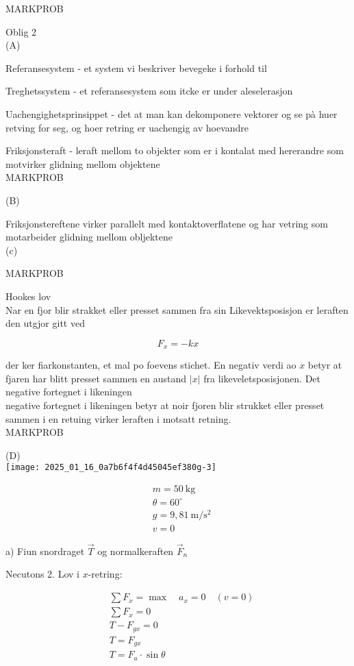 \documentclass[10pt]{article}
\begin{document}
MARKPROB

Oblig 2\\
(A)

Referansesystem - et system vi beskriver bevegeke i forhold til

Treghetssystem - et referansesystem som itcke er under aleselerasjon

Uachengighetsprinsippet - det at man kan dekomponere vektorer og se pà huer retving for seg, og hoer retring er uachengig av hoevandre

Friksjonsteraft - leraft mellom to objekter som er i kontalat med hererandre som motvirker glidning mellom objektene\\

MARKPROB

(B)

Friksjonstereftene virker parallelt med kontaktoverflatene og har vetring som motarbeider glidning mellom obljektene\\
(c)

MARKPROB

Hookes lov\\
Nar en fjor blir strakket eller presset sammen fra sin Likevektsposisjon er leraften den utgjor gitt ved

$$
F_{x}=-k x
$$

der ker fiarkonstanten, et mal po foevens stichet. En negativ verdi ao $x$ betyr at fjaren har blitt presset sammen en austand $|x|$ fra likeveletsposisjonen. Det negative fortegnet i likeningen\\
negative fortegnet i likeningen betyr at noir fjoren blir strukket eller presset sammen i en retuing virker leraften i motsatt retning.\\

MARKPROB

(D)\\
\texttt{[image: 2025\_01\_16\_0a7b6f4f4d45045ef380g-3]}

$$
\begin{aligned}
& m=50 \mathrm{~kg} \\
& \theta=60^{\circ} \\
& g=9,81 \mathrm{~m} / \mathrm{s}^{2} \\
& v=0
\end{aligned}
$$

a) Fiun snordraget $\vec{T}$ og normalkeraften $\vec{F}_{n}$

Necutons 2. Lov i $x$-retring:

$$
\begin{aligned}
& \sum F_{x}=\max \quad a_{x}=0 \quad(v=0) \\
& \sum F_{x}=0 \\
& T-F_{g x}=0 \\
& T=F_{g x} \\
& T=F_{a} \cdot \sin \theta
\end{aligned}
$$
\end{document}
